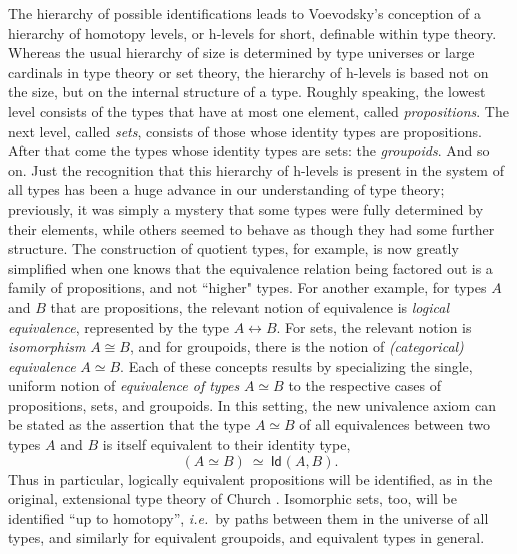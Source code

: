 \documentclass[11pt]{article}
\newcommand{\Id}{\mathsf{Id}}
\newcommand{\id}[1]{\Id_{#1}}
\theoremstyle{remark}
\theoremstyle{definition}
\begin{document}
The hierarchy of possible identifications leads to Voevodsky's conception of a hierarchy of homotopy levels, or h-levels
for short, definable within type theory.  Whereas the usual hierarchy of size is determined by type universes or large
cardinals in type theory or set theory, the hierarchy of h-levels is based not on the size, but on the internal
structure of a type.  Roughly speaking, the lowest level consists of the types that have at most one element, called
\emph{propositions}.  The next level, called \emph{sets}, consists of those whose identity types are propositions. After
that come the types whose identity types are sets: the \emph{groupoids}.  And so on.  Just the recognition that this
hierarchy of h-levels is present in the system of all types has been a huge advance in our understanding of type theory;
previously, it was simply a mystery that some types were fully determined by their elements, while others seemed to
behave as though they had some further structure.  The construction of quotient types, for example, is now greatly
simplified when one knows that the equivalence relation being factored out is a family of propositions, and not
``higher" types.  For another example, for types $A$ and $B$ that are propositions, the relevant notion of equivalence
is \emph{logical equivalence}, represented by the type $A\leftrightarrow B$.  For sets, the relevant notion is
\emph{isomorphism} $A\cong B$, and for groupoids, there is the notion of \emph{(categorical) equivalence} $A\simeq B$.
Each of these concepts results by specializing the single, uniform notion of \emph{equivalence of types} $A\simeq B$ to
the respective cases of propositions, sets, and groupoids.  In this setting, the new univalence axiom can be stated as
the assertion that the type $A\simeq B$ of all equivalences between two types $A$ and $B$ is itself equivalent to their
identity type,
\[\tag{UA}
(A\simeq B)\ \simeq\  \id{}(A,B).
\]
Thus in particular, logically equivalent propositions will be identified, as in the original, extensional type theory of
Church \cite{Church}.  Isomorphic sets, too, will be identified ``up to homotopy'', \textit{i.e.}\ by paths between them in the
universe of all types, and similarly for equivalent groupoids, and equivalent types in general.
\end{document}
